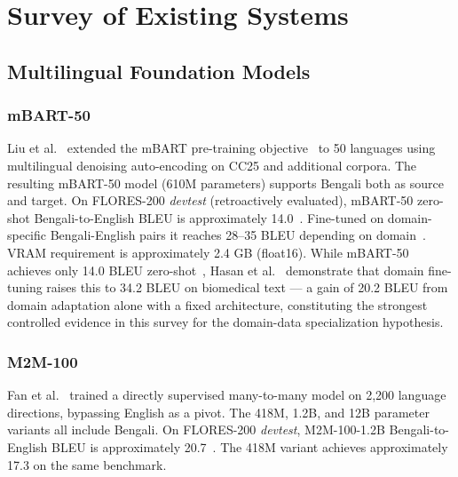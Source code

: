 \documentclass[conference]{IEEEtran}
\begin{document}
\section{Survey of Existing Systems}
\label{sec:survey}

\subsection{Multilingual Foundation Models}

\subsubsection{mBART-50}
Liu et al.~\cite{liu2020mbart50} extended the mBART
pre-training objective~\cite{liu2020mbart} to 50 languages using
multilingual denoising auto-encoding on CC25 and additional corpora.
The resulting mBART-50 model (610M parameters) supports Bengali both as
source and target.
On FLORES-200 \textit{devtest} (retroactively evaluated), mBART-50
zero-shot Bengali-to-English BLEU is approximately 14.0~\cite{nllb2022}.
Fine-tuned on domain-specific Bengali-English pairs it reaches 28--35
BLEU depending on domain~\cite{hasan2020low}.
VRAM requirement is approximately 2.4 GB (float16).
While mBART-50 achieves only 14.0 BLEU zero-shot~\cite{nllb2022}, Hasan
et al.~\cite{hasan2020low} demonstrate that domain fine-tuning raises this to
34.2 BLEU on biomedical text --- a gain of 20.2 BLEU from domain adaptation
alone with a fixed architecture, constituting the strongest controlled evidence
in this survey for the domain-data specialization hypothesis.

\subsubsection{M2M-100}
Fan et al.~\cite{fan2021m2m100} trained a directly supervised
many-to-many model on 2,200 language directions, bypassing English as a
pivot.
The 418M, 1.2B, and 12B parameter variants all include Bengali.
On FLORES-200 \textit{devtest}, M2M-100-1.2B Bengali-to-English BLEU
is approximately 20.7~\cite{nllb2022}.
The 418M variant achieves approximately 17.3 on the same benchmark.
\end{document}
